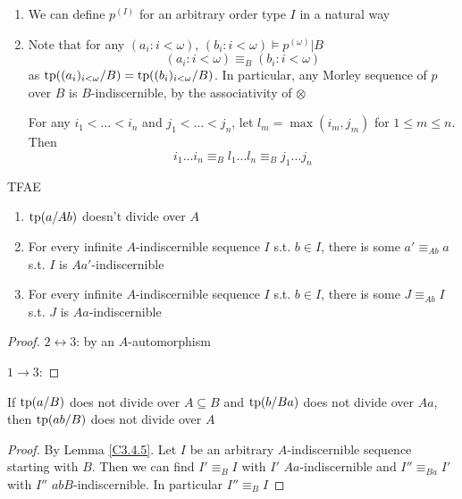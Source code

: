 \documentclass[11pt]{article}
\begin{document}
\begin{remark}
\begin{enumerate}
\item We can define \(p^{(I)}\) for an arbitrary order type \(I\) in a natural way
\item Note that for any \((a_i:i<\omega)\), \((b_i:i<\omega)\vDash p^{(\omega)}|B\)
\begin{equation*}
(a_i:i<\omega)\equiv_B(b_i:i<\omega)
\end{equation*}
as \(\operatorname{tp}((a_i)_{i<\omega}/B)=\operatorname{tp}((b_i)_{i<\omega}/B)\). In particular, any Morley sequence of \(p\)
over \(B\) is \(B\)-indiscernible, by the associativity of \(\otimes\)

For any \(i_1<\dots<i_n\) and \(j_1<\dots<j_n\), let \(l_m=\max(i_m,j_m)\) for \(1\le m\le n\). Then
\begin{equation*}
i_1\dots i_n\equiv_Bl_1\dots l_n\equiv_B j_1\dots j_n
\end{equation*}
\end{enumerate}
\end{remark}

\begin{lemma}[]
\label{C3.4.5}
TFAE
\begin{enumerate}
\item \(\operatorname{tp}(a/Ab)\) doesn't divide over \(A\)
\item For every infinite \(A\)-indiscernible sequence \(I\) s.t. \(b\in I\), there is
some \(a'\equiv_{Ab}a\) s.t. \(I\) is \(Aa'\)-indiscernible
\item For every infinite \(A\)-indiscernible sequence \(I\) s.t. \(b\in I\), there is
some \(J\equiv_{Ab}I\) s.t. \(J\) is \(Aa\)-indiscernible
\end{enumerate}
\end{lemma}

\begin{proof}
\(2\leftrightarrow 3\): by an \(A\)-automorphism

\(1\to 3\):
\end{proof}

\begin{corollary}[]
If \(\operatorname{tp}(a/B)\) does not divide over \(A\subseteq B\) and \(\operatorname{tp}(b/Ba)\) does not divide over \(Aa\),
then \(\operatorname{tp}(ab/B)\) does not divide over \(A\)
\end{corollary}

\begin{proof}
By Lemma \ref{C3.4.5}. Let \(I\) be an arbitrary \(A\)-indiscernible sequence starting with \(B\).
Then we can find \(I'\equiv_BI\) with \(I'\) \(Aa\)-indiscernible and \(I''\equiv_{Ba}I'\)
with \(I''\) \(abB\)-indiscernible. In particular \(I''\equiv_BI\)
\end{proof}
\end{document}

